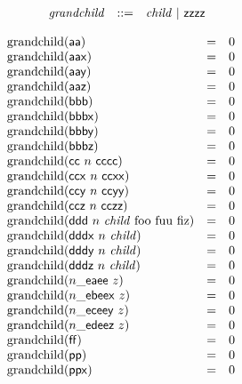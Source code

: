 $$
\begin{array}{@{}lrrl@{}l@{}}
& {\mathit{grandchild}} &::=& {\mathit{child}} ~|~ \mathsf{zzzz} \\
\end{array}
$$

$$
\begin{array}{@{}lcl@{}l@{}}
{\mathrm{grandchild}}(\mathsf{aa}) &=& 0 \\
{\mathrm{grandchild}}(\mathsf{aax}) &=& 0 \\
{\mathrm{grandchild}}(\mathsf{aay}) &=& 0 \\
{\mathrm{grandchild}}(\mathsf{aaz}) &=& 0 \\
{\mathrm{grandchild}}(\mathsf{bbb}) &=& 0 \\
{\mathrm{grandchild}}(\mathsf{bbbx}) &=& 0 \\
{\mathrm{grandchild}}(\mathsf{bbby}) &=& 0 \\
{\mathrm{grandchild}}(\mathsf{bbbz}) &=& 0 \\
{\mathrm{grandchild}}(\mathsf{cc}~n~\mathsf{cccc}) &=& 0 \\
{\mathrm{grandchild}}(\mathsf{ccx}~n~\mathsf{ccxx}) &=& 0 \\
{\mathrm{grandchild}}(\mathsf{ccy}~n~\mathsf{ccyy}) &=& 0 \\
{\mathrm{grandchild}}(\mathsf{ccz}~n~\mathsf{cczz}) &=& 0 \\
{\mathrm{grandchild}}(\mathsf{ddd}~n~{\mathit{child}}~{\mathrm{foo}}~{\mathrm{fuu}}~{\mathrm{fiz}}) &=& 0 \\
{\mathrm{grandchild}}(\mathsf{dddx}~n~{\mathit{child}}) &=& 0 \\
{\mathrm{grandchild}}(\mathsf{dddy}~n~{\mathit{child}}) &=& 0 \\
{\mathrm{grandchild}}(\mathsf{dddz}~n~{\mathit{child}}) &=& 0 \\
{\mathrm{grandchild}}({n}{\mathsf{\_}}{\mathsf{ea}}{\mathsf{ee}}~z) &=& 0 \\
{\mathrm{grandchild}}({n}{\mathsf{\_}}{\mathsf{eb}}{\mathsf{eex}}~z) &=& 0 \\
{\mathrm{grandchild}}({n}{\mathsf{\_}}{\mathsf{ec}}{\mathsf{eey}}~z) &=& 0 \\
{\mathrm{grandchild}}({n}{\mathsf{\_}}{\mathsf{ed}}{\mathsf{eez}}~z) &=& 0 \\
{\mathrm{grandchild}}(\mathsf{ff}) &=& 0 \\
{\mathrm{grandchild}}(\mathsf{pp}) &=& 0 \\
{\mathrm{grandchild}}(\mathsf{ppx}) &=& 0 \\

\end{array}$$
